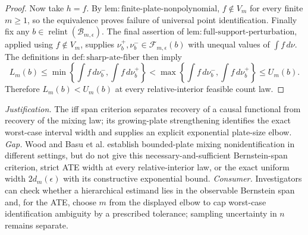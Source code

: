 \documentclass{article}
\begin{document}
\begin{proof}
Now take \(h=f\). By \(\mathrm{lem{:}finite\text{-}plate\text{-}nonpolynomial}\), \(f\notin V_m\) for every finite \(m\ge1\), so the equivalence proves failure of universal point identification. Finally fix any \(b\in\operatorname{relint}(\mathcal B_{m,\epsilon})\). The final assertion of \(\mathrm{lem{:}full\text{-}support\text{-}perturbation}\), applied using \(f\notin V_m\), supplies \(\nu_b^+,\nu_b^-\in\mathcal F_{m,\epsilon}(b)\) with unequal values of \(\int f\,d\nu\). The definitions in \(\mathrm{def{:}sharp\text{-}ate\text{-}fiber}\) then imply
\[
L_m(b)
\le
\min\left\{\int f\,d\nu_b^-,\int f\,d\nu_b^+\right\}
<
\max\left\{\int f\,d\nu_b^-,\int f\,d\nu_b^+\right\}
\le
U_m(b).
\]
Therefore \(L_m(b)<U_m(b)\) at every relative-interior feasible count law.
\end{proof}
\par\smallskip\noindent \textit{Justification.} The iff span criterion separates recovery of a causal functional from recovery of the mixing law; its growing-plate strengthening identifies the exact worst-case interval width and supplies an explicit exponential plate-size elbow. \textit{Gap.} Wood and Basu et al. establish bounded-plate mixing nonidentification in different settings, but do not give this necessary-and-sufficient Bernstein-span criterion, strict ATE width at every relative-interior law, or the exact uniform width \(2d_m(\epsilon)\) with its constructive exponential bound. \textit{Consumer.} Investigators can check whether a hierarchical estimand lies in the observable Bernstein span and, for the ATE, choose \(m\) from the displayed elbow to cap worst-case identification ambiguity by a prescribed tolerance; sampling uncertainty in \(n\) remains separate.
\end{document}
